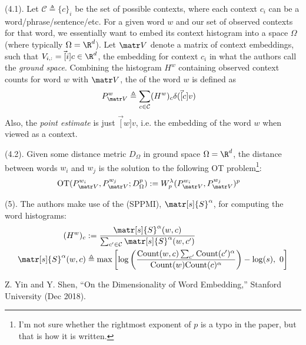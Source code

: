 \documentclass[11pt]{article}
\begin{document}
\myspace
\p {} (4.1). Let $\mathcal C \triangleq \{ c  \}_i$ be the set of possible contexts, where each context $c_i$ can be a word/phrase/sentence/etc. For a given word $w$ and our set of observed contexts for that word, we essentially want to embed its context histogram into a space $\Omega$ (where typically $\Omega = \R^d$).  Let $\matr V$ denote a matrix of context embeddings, such that $V_{i,:} = \vec[i]{c} \in \R^d$, the embedding for context $c_i$ in what the authors call the \textit{ground space}. Combining the histogram $H^w$ containing observed context counts for word $w$ with $\matr V$, the  of the word $w$ is defined as
\begin{align}
P_{\matr V}^w
&\triangleq \sum_{c \in \mathcal C} (H^w)_c \delta(\vec[c]{v})
\end{align}
Also, the \textit{point estimate} is just $\vec[w]{v}$, i.e. the embedding of the word $w$ when viewed as a context. 

\myspace
\p {} (4.2). Given some distance metric $D_{\Omega}$ in ground space $\Omega = \R^d$, the distance between words $w_i$ and $w_j$ is the solution to the following OT problem\footnote{I'm not sure whether the rightmost exponent of $p$ is a typo in the paper, but that is how it is written.}:
\begin{align}
\text{OT}(P_{\matr V}^{w_i},  P_{\matr V}^{w_j}; D_{\Omega}^p)
&:= W_p^{\lambda}( P_{\matr V}^{w_i},  P_{\matr V}^{w_j}  )^p
\end{align}

\myspace
\p {} (5). The authors make use of the  (SPPMI), $\matr[s]{S}^{\alpha}$, for computing the word histograms:
\begin{align}
(H^w)_c
&:= \frac{
	\matr[s]{S}^{\alpha}(w, c)
}{  
	\sum_{c' \in \mathcal C} \matr[s]{S}^{\alpha}(w, c')
}\\
\matr[s]{S}^{\alpha}(w, c)
&\triangleq \max \left[ 
\log\left(  \frac{ \text{Count}(w, c) \sum_{c'} \text{Count}(c')^{\alpha} }{  \text{Count}(w)\text{Count}(c)^{\alpha}  }   \right) - \log(s),
~0
\right]
\end{align}






\vspace{-1em}
{\footnotesize Z. Yin and Y. Shen, ``On the Dimensionality of Word Embedding,'' Stanford University (Dec 2018).}
\end{document}
